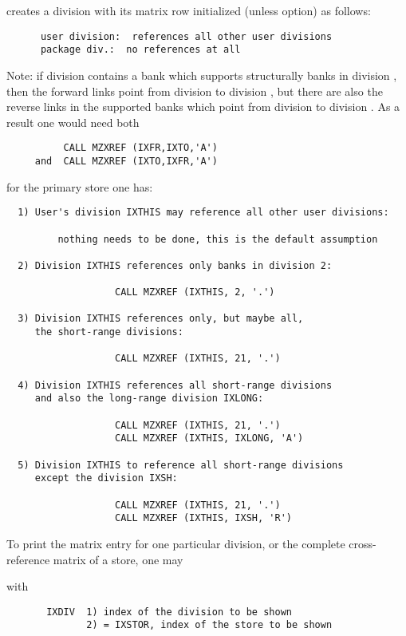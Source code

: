  creates a division with its matrix row initialized
(unless  option) as follows:
\begin{verbatim}
      user division:  references all other user divisions
      package div.:  no references at all
\end{verbatim} 

Note: if division  contains a bank which supports structurally
banks in division ,
then the forward links point from division  to division ,
but there are also the reverse links in the supported banks
which point from division  to division .
As a result one would need both
\begin{verbatim}
          CALL MZXREF (IXFR,IXTO,'A')
     and  CALL MZXREF (IXTO,IXFR,'A')
\end{verbatim} 

\Examples

for the primary store one has:

\begin{verbatim}
  1) User's division IXTHIS may reference all other user divisions:

         nothing needs to be done, this is the default assumption

  2) Division IXTHIS references only banks in division 2:

                   CALL MZXREF (IXTHIS, 2, '.')

  3) Division IXTHIS references only, but maybe all,
     the short-range divisions:

                   CALL MZXREF (IXTHIS, 21, '.')

  4) Division IXTHIS references all short-range divisions
     and also the long-range division IXLONG:

                   CALL MZXREF (IXTHIS, 21, '.')
                   CALL MZXREF (IXTHIS, IXLONG, 'A')

  5) Division IXTHIS to reference all short-range divisions
     except the division IXSH:

                   CALL MZXREF (IXTHIS, 21, '.')
                   CALL MZXREF (IXTHIS, IXSH, 'R')
\end{verbatim} 

To print the matrix entry for one particular division,
or the complete cross-reference matrix of a store, one may


with
\begin{verbatim}
       IXDIV  1) index of the division to be shown
              2) = IXSTOR, index of the store to be shown
\end{verbatim} 

